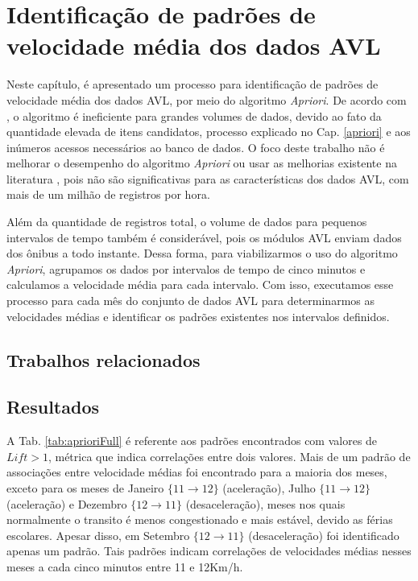 \documentclass[
	12pt,				%
	oneside,			%
	a4paper,			%
	english,			%
	brazil				%
	]{abntex2ppgsi}
\begin{document}
\chapter{Identificação de padrões de velocidade média dos dados AVL}

Neste capítulo, é apresentado um processo para identificação de padrões de velocidade média dos dados AVL, por meio do algoritmo \textit{Apriori}. De acordo com \cite{xie2008optimization}, o algoritmo é ineficiente para grandes volumes de dados, devido ao fato da quantidade elevada de itens candidatos, processo explicado no Cap. \ref{apriori} e aos inúmeros acessos necessários ao banco de dados. O foco deste trabalho não é melhorar o desempenho do algoritmo \textit{Apriori} ou usar as melhorias existente na literatura \cite{xie2008optimization, zhang2014method}, pois não são significativas para as características dos dados AVL, com mais de um milhão de registros por hora.

Além da quantidade de registros total, o volume de dados para pequenos intervalos de tempo também é considerável, pois os módulos AVL enviam dados dos ônibus a todo instante. Dessa forma, para viabilizarmos o uso do algoritmo \textit{Apriori}, agrupamos os dados por intervalos de tempo de cinco minutos e calculamos a velocidade média para cada intervalo. Com isso, executamos esse processo para cada mês do conjunto de dados AVL para determinarmos as velocidades médias e identificar os padrões existentes nos intervalos definidos.

\section{Trabalhos relacionados}

\section{Resultados}

A Tab. \ref{tab:aprioriFull} é referente aos padrões encontrados com valores de $\textit{Lift} > 1$, métrica que indica correlações entre dois valores. Mais de um padrão de associações entre velocidade médias foi encontrado para a maioria dos meses, exceto para os meses de Janeiro $\lbrace 11 \rightarrow 12 \rbrace$ (aceleração), Julho $\lbrace 11 \rightarrow 12\rbrace$ (aceleração) e Dezembro $\lbrace12 \rightarrow 11\rbrace$ (desaceleração), meses nos quais normalmente o transito é menos congestionado e mais estável, devido as férias escolares. Apesar disso, em Setembro $\lbrace12 \rightarrow 11\rbrace$ (desaceleração) foi identificado apenas um padrão. Tais padrões indicam correlações de velocidades médias nesses meses a cada cinco minutos entre 11 e 12Km/h.
\end{document}
